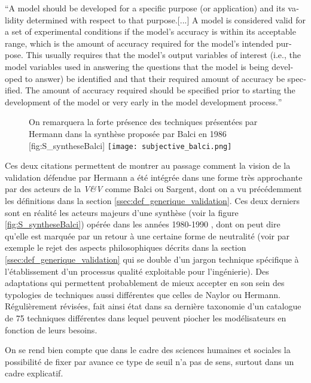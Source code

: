 \foreignquote{english}{A model should be developed for a specific purpose (or application) and its validity determined with respect to that purpose.[...] A model is considered valid for a set of experimental conditions if the model’s accuracy is within its acceptable range, which is the amount of accuracy required for the model’s intended purpose. This usually requires that the model’s output variables of interest (i.e., the model variables used in answering the questions that the model is being developed to answer) be identified and that their required amount of accuracy be specified. The amount of accuracy required should be specified prior to starting the development of the model or very early in the model development process.}\autocite[166]{Sargent2010}

\begin{figure}[h]
\begin{sidecaption}[fortoc]{ On remarquera la forte présence des techniques présentées par Hermann dans la synthèse proposée par Balci en 1986 \autocite{Balci1986}}[fig:S_syntheseBalci]
  \centering
 \texttt{[image: subjective\_balci.png]}
  \end{sidecaption}
\end{figure}

Ces deux citations permettent de montrer au passage comment la vision de la validation défendue par Hermann a été intégrée dans une forme très approchante par des acteurs de la \textit{V\&V} comme Balci ou Sargent, dont on a vu précédemment les définitions dans la section \ref{ssec:def_generique_validation}. Ces deux derniers sont en réalité les acteurs majeurs d'une synthèse (voir la figure \ref{fig:S_syntheseBalci}) opérée dans les années 1980-1990 \autocite{Nance2002}, dont on peut dire qu'elle est marquée par un retour à une certaine forme de neutralité (voir par exemple le rejet des aspects philosophiques décrits dans la section \ref{ssec:def_generique_validation} qui se double d'un jargon technique spécifique à l'établissement d'un processus qualité exploitable pour l'ingénierie). Des adaptations qui permettent probablement de mieux accepter en son sein des typologies de techniques aussi différentes que celles de Naylor ou Hermann. Régulièrement révisées, \textcite{Balci1998} fait ainsi état dans sa dernière taxonomie d'un catalogue de 75 techniques différentes dans lequel peuvent piocher les modélisateurs en fonction de leurs besoins.

On se rend bien compte que dans le cadre des sciences humaines et sociales la possibilité de fixer par avance ce type de seuil n'a pas de sens, surtout dans un cadre explicatif.

